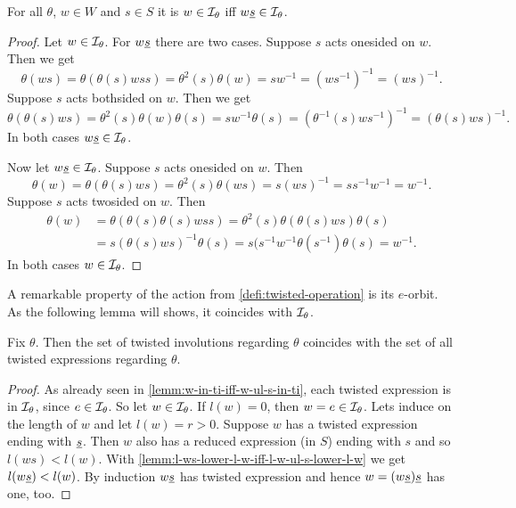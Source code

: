 \begin{lemm}
	For all $\theta$, $w \in W$ and $s \in S$ it is $w \in \mathcal{I}_{\theta}$ iff $w \underline{s} \in \mathcal{I}_{\theta}$.

	\begin{proof}
		Let $w \in \mathcal{I}_{\theta}$. For $w \underline{s}$ there are two cases. Suppose $s$ acts onesided on $w$. Then we get
		$$ \theta(ws) = \theta(\theta(s)wss) = \theta^2(s) \theta(w) = sw^{-1} = (ws^{-1})^{-1} = (ws)^{-1}. $$
		Suppose $s$ acts bothsided on $w$. Then we get
		$$ \theta(\theta(s)ws) = \theta^2(s) \theta(w) \theta(s) = sw^{-1}\theta(s) = (\theta^{-1}(s)ws^{-1})^{-1} = (\theta(s)ws)^{-1}. $$
		In both cases $w \underline{s} \in \mathcal{I}_{\theta}$.

		Now let $w \underline{s} \in \mathcal{I}_{\theta}$. Suppose $s$ acts onesided on $w$. Then
		$$ \theta(w) = \theta(\theta(s)ws) = \theta^2(s)\theta(ws) = s (ws)^{-1} = ss^{-1}w^{-1} = w^{-1}. $$
		Suppose $s$ acts twosided on $w$. Then
		\begin{align*}
			\theta(w)	& = \theta(\theta(s)\theta(s)wss) = \theta^2(s) \theta(\theta(s)ws) \theta(s) \\
						& = s (\theta(s)ws)^{-1} \theta(s) = s(s^{-1} w^{-1} \theta(s^{-1}) \theta(s) = w^{-1}.
		\end{align*}
		In both cases $w \in \mathcal{I}_{\theta}$.
	\end{proof}
\end{lemm}

A remarkable property of the action from \ref{defi:twisted-operation} is its $e$-orbit. As the following lemma will shows, it coincides with $\mathcal{I}_{\theta}$.

\begin{lemm}
	Fix $\theta$. Then the set of twisted involutions regarding $\theta$ coincides with the set of all twisted expressions regarding $\theta$.

	\begin{proof}
		As already seen in \ref{lemm:w-in-ti-iff-w-ul-s-in-ti}, each twisted expression is in $\mathcal{I}_{\theta}$, since $e \in \mathcal{I}_{\theta}$. So let $w \in \mathcal{I}_{\theta}$. If $l(w) = 0$, then $w = e \in \mathcal{I}_{\theta}$. Lets induce on the length of $w$ and let $l(w) = r > 0$. Suppose $w$ has a twisted expression ending with $\underline{s}$. Then $w$ also has a reduced expression (in $S$) ending with $s$ and so $l(ws) < l(w)$. With \ref{lemm:l-ws-lower-l-w-iff-l-w-ul-s-lower-l-w} we get $l(w \underline{s}) < l(w)$. By induction $w \underline{s}$ has twisted expression and hence $w = (w \underline{s}) \underline{s}$ has one, too.
	\end{proof} 
\end{lemm}

